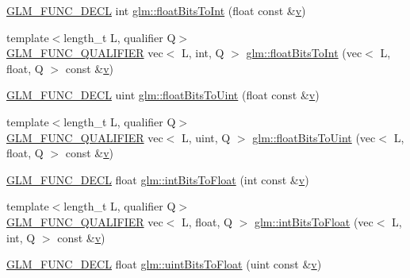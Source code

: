 \begin{DoxyCompactItemize}
\item 
\hyperlink{setup_8hpp_ab2d052de21a70539923e9bcbf6e83a51}{G\+L\+M\+\_\+\+F\+U\+N\+C\+\_\+\+D\+E\+CL} int \hyperlink{group__core__func__common_gadc6a536a7bef046c3293d2ccad6d9ca2}{glm\+::float\+Bits\+To\+Int} (float const \&\hyperlink{_s_d_l__opengl_8h_a10a82eabcb59d2fcd74acee063775f90}{v})
\item 
{\footnotesize template$<$length\+\_\+t L, qualifier Q$>$ }\\\hyperlink{setup_8hpp_a33fdea6f91c5f834105f7415e2a64407}{G\+L\+M\+\_\+\+F\+U\+N\+C\+\_\+\+Q\+U\+A\+L\+I\+F\+I\+ER} vec$<$ L, int, Q $>$ \hyperlink{group__core__func__common_ga99f7d62f78ac5ea3b49bae715c9488ed}{glm\+::float\+Bits\+To\+Int} (vec$<$ L, float, Q $>$ const \&\hyperlink{_s_d_l__opengl_8h_a10a82eabcb59d2fcd74acee063775f90}{v})
\item 
\hyperlink{setup_8hpp_ab2d052de21a70539923e9bcbf6e83a51}{G\+L\+M\+\_\+\+F\+U\+N\+C\+\_\+\+D\+E\+CL} uint \hyperlink{group__core__func__common_ga748b4d2819b48d28ca09dc8733488873}{glm\+::float\+Bits\+To\+Uint} (float const \&\hyperlink{_s_d_l__opengl_8h_a10a82eabcb59d2fcd74acee063775f90}{v})
\item 
{\footnotesize template$<$length\+\_\+t L, qualifier Q$>$ }\\\hyperlink{setup_8hpp_a33fdea6f91c5f834105f7415e2a64407}{G\+L\+M\+\_\+\+F\+U\+N\+C\+\_\+\+Q\+U\+A\+L\+I\+F\+I\+ER} vec$<$ L, uint, Q $>$ \hyperlink{group__core__func__common_ga49418ba4c8a60fbbb5d57b705f3e26db}{glm\+::float\+Bits\+To\+Uint} (vec$<$ L, float, Q $>$ const \&\hyperlink{_s_d_l__opengl_8h_a10a82eabcb59d2fcd74acee063775f90}{v})
\item 
\hyperlink{setup_8hpp_ab2d052de21a70539923e9bcbf6e83a51}{G\+L\+M\+\_\+\+F\+U\+N\+C\+\_\+\+D\+E\+CL} float \hyperlink{group__core__func__common_ga2650dc57b2148a6ffbce20944fb4d97a}{glm\+::int\+Bits\+To\+Float} (int const \&\hyperlink{_s_d_l__opengl_8h_a10a82eabcb59d2fcd74acee063775f90}{v})
\item 
{\footnotesize template$<$length\+\_\+t L, qualifier Q$>$ }\\\hyperlink{setup_8hpp_a33fdea6f91c5f834105f7415e2a64407}{G\+L\+M\+\_\+\+F\+U\+N\+C\+\_\+\+Q\+U\+A\+L\+I\+F\+I\+ER} vec$<$ L, float, Q $>$ \hyperlink{group__core__func__common_ga7a0a8291a1cf3e1c2aee33030a1bd7b0}{glm\+::int\+Bits\+To\+Float} (vec$<$ L, int, Q $>$ const \&\hyperlink{_s_d_l__opengl_8h_a10a82eabcb59d2fcd74acee063775f90}{v})
\item 
\hyperlink{setup_8hpp_ab2d052de21a70539923e9bcbf6e83a51}{G\+L\+M\+\_\+\+F\+U\+N\+C\+\_\+\+D\+E\+CL} float \hyperlink{group__core__func__common_ga97464ca9ff4267de30ea408f700d4ca8}{glm\+::uint\+Bits\+To\+Float} (uint const \&\hyperlink{_s_d_l__opengl_8h_a10a82eabcb59d2fcd74acee063775f90}{v})

\end{DoxyCompactItemize}

